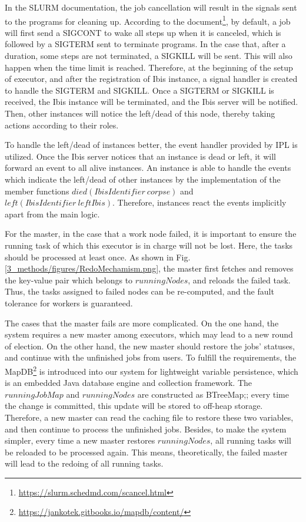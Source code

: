 In the SLURM documentation, the job cancellation will result in the signals sent to the programs for cleaning up. 
According to the document\footnote{\url{https://slurm.schedmd.com/scancel.html}}, by default, a job will first send a SIGCONT to wake all steps up when it is canceled, which is followed by a SIGTERM sent to terminate programs. 
In the case that, after a duration, some steps are not terminated, a SIGKILL will be sent.
This will also happen when the time limit is reached. 
Therefore, at the beginning of the setup of executor, and after the registration of Ibis instance, a signal handler is created to handle the SIGTERM and SIGKILL. 
Once a SIGTERM or SIGKILL is received, the Ibis instance will be terminated, and the Ibis server will be notified. 
Then, other instances will notice the left/dead of this node, thereby taking actions according to their roles.

To handle the left/dead of instances better, the event handler provided by IPL is utilized. 
Once the Ibis server notices that an instance is dead or left, it will forward an event to all alive instances. 
An instance is able to handle the events which indicate the left/dead of other instances by the implementation of the member functions  $died(IbisIdentifier \ corpse)$ and $left(IbisIdentifier \ leftIbis)$.
Therefore, instances react the events implicitly apart from the main logic.

For the master, in the case that a work node failed, it is important to ensure the running task of which this executor is in charge will not be lost. 
Here, the tasks should be processed at least once. 
As shown in Fig. \ref{3_methods/figures/RedoMechamism.png}, the master first fetches and removes the key-value pair which belongs to  $runningNodes$, and reloads the failed task. 
Thus, the tasks assigned to failed nodes can be re-computed, and the fault tolerance for workers is guaranteed.

The cases that the master fails are more complicated. On the one hand, the system requires a new master among executors, which may lead to a new round of election.
On the other hand, the new master should restore the jobs’ statuses, and continue with the unfinished jobs from users.
To fulfill the requirements, the MapDB\footnote{\url{https://jankotek.gitbooks.io/mapdb/content/}} is introduced into our system for lightweight variable persistence, which is an embedded Java database engine and collection framework.
The $runningJobMap$ and $runningNodes$ are constructed as BTreeMap;; every time the change is committed, this update will be stored to off-heap storage. 
Therefore,  a new master can read the caching file to restore these two variables, and then continue to process the unfinished jobs. 
Besides, to make the system simpler, every time a new master restores  $runningNodes$, all running tasks will be reloaded to be processed again.
This means, theoretically, the failed master will lead to the redoing of all running tasks.

